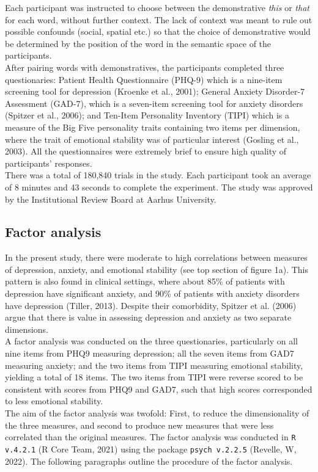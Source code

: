 \documentclass[11pt, a4paper]{article}
\begin{document}
Each participant was instructed to choose between the demonstrative \textit{this} or \textit{that} for each word, without further context. The lack of context was meant to rule out possible confounds (social, spatial etc.) so that the choice of demonstrative would be determined by the position of the word in the semantic space of the participants. \\
After pairing words with demonstratives, the participants completed three questionaries: Patient Health Questionnaire (PHQ-9) which is a nine-item screening tool for depression (Kroenke et al., 2001); General Anxiety Disorder-7 Assessment (GAD-7), which is a seven-item screening tool for anxiety disorders (Spitzer et al., 2006); and Ten-Item Personality Inventory (TIPI) which is a measure of the Big Five personality traits containing two items per dimension, where the trait of emotional stability was of particular interest (Gosling et al., 2003). All the questionnaires were extremely brief to ensure high quality of participants’ responses. \\

There was a total of 180,840 trials in the study. Each participant took an average of 8 minutes and 43 seconds to complete the experiment. The study was approved by the Institutional Review Board at Aarhus University.  


\subsection{Factor analysis}
In the present study, there were moderate to high correlations between measures of depression, anxiety, and emotional stability (see top section of figure 1a). This pattern is also found in clinical settings, where about 85\% of patients with depression have significant anxiety, and 90\% of patients with anxiety disorders have depression (Tiller, 2013). Despite their comorbidity, Spitzer et al. (2006) argue that there is value in assessing depression and anxiety as two separate dimensions.\\

A factor analysis was conducted on the three questionaries, particularly on all nine items from PHQ9 measuring depression; all the seven items from GAD7 measuring anxiety; and the two items from TIPI measuring emotional stability, yielding a total of 18 items. The two items from TIPI were reverse scored to be consistent with scores from PHQ9 and GAD7, such that high scores corresponded to less emotional stability. \\
The aim of the factor analysis was twofold: First, to reduce the dimensionality of the three measures, and second to produce new measures that were less correlated than the original measures. The factor analysis was conducted in \texttt{R v.4.2.1} (R Core Team, 2021) using the package \texttt{psych v.2.2.5} (Revelle, W, 2022). The following paragraphs outline the procedure of the factor analysis. \\
\end{document}
